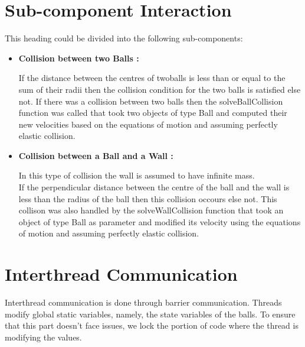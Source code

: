 \documentclass[]{article}
\begin{document}
\section{Sub-component Interaction}
\begin{flushleft}
This heading could be divided into the following sub-components:
\begin{itemize}

\item \textbf{Collision between two Balls :}\\

\begin{flushleft}
If the distance between the centres of twoballs is less than or equal to the sum of their radii then the collision condition for the two balls is satisfied else not. If there was a collision between two balls then the solveBallCollision function was called that took two objects of type Ball and computed their new velocities based on the equations of motion and assuming perfectly elastic collision.
\end{flushleft}

\item \textbf{Collision between a Ball and a Wall :} \\

\begin{flushleft}
In this type of collision the wall is assumed to have infinite mass.\\
If the perpendicular distance between the centre of the ball and the wall is less than the radius of the ball then this collision occours else not. This collison was also handled by the solveWallCollision function that took an object of type Ball as parameter and modified its velocity using the equations of motion and assuming perfectly elastic collision.
\end{flushleft}  
\end{itemize}
\end{flushleft}

\section{Interthread Communication}
Interthread communication is done through barrier communication. Threads modify global static variables, namely, the state variables of the balls.
To ensure that this part doesn't face issues, we lock the portion of code where the thread is modifying the values.
\begin{flushleft}

\end{flushleft}
\end{document}
